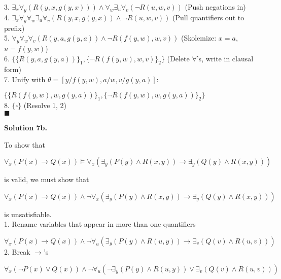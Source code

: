 \documentclass{article}
\newcommand{\tOne}{7.5cm}
\begin{document}
{3. $\exists_x\forall_y(R(y, x, g(y, x))) \wedge \forall_w\exists_u\forall_v(\neg{R}(u, w, v))$ \tabto{\tOne}(Push negations in)\\

4. $\exists_x\forall_y\forall_w\exists_u\forall_v(R(y, x, g(y, x)) \wedge \neg{R}(u, w, v))$ \tabto{\tOne}(Pull quantifiers out to prefix)\\

5. $\forall_y\forall_w\forall_v(R(y, a, g(y, a)) \wedge \neg{R}(f(y, w), w, v))$ \tabto{\tOne}(Skolemize: $x = a$, $u = f(y, w)$)\\

6. $\{\{R(y, a, g(y, a))\}_1, \{\neg{R}(f(y, w), w, v)\}_2\}$ \tabto{\tOne}(Delete $\forall$'s, write in clausal form)\\

7. Unify with $\theta = [y/f(y, w), a/w, v/g(y, a)]$:

$\{\{R(f(y, w), w, g(y, a))\}_1, \{\neg{R}(f(y, w), w, g(y, a))\}_2\}$\\

8. $\{\square\}$ \tabto{\tOne}(Resolve 1, 2)\\

$\blacksquare$

\pagebreak

\textbf{\large{Solution 7b.}}

To show that 

\begin{center}
$\forall_x(P(x) \rightarrow Q(x)) \vDash \forall_x(\exists_y(P(y) \wedge R(x, y)) \rightarrow \exists_y(Q(y) \wedge R(x, y)))$
\end{center}

is valid, we must show that 

\begin{center}
$\forall_x(P(x) \rightarrow Q(x)) \wedge \neg\forall_x(\exists_y(P(y) \wedge R(x, y)) \rightarrow \exists_y(Q(y) \wedge R(x, y)))$ 
\end{center}

is unsatisfiable.\\

1. Rename variables that appear in more than one quantifiers

$\forall_x(P(x) \rightarrow Q(x)) \wedge \neg\forall_u(\exists_y(P(y) \wedge R(u, y)) \rightarrow \exists_v(Q(v) \wedge R(u, v)))$ \\

2. Break $\rightarrow$'s

$\forall_x(\neg{P}(x) \vee Q(x)) \wedge \neg\forall_u(\neg\exists_y(P(y) \wedge R(u, y)) \vee \exists_v(Q(v) \wedge R(u, v)))$ \\

}
\end{document}
